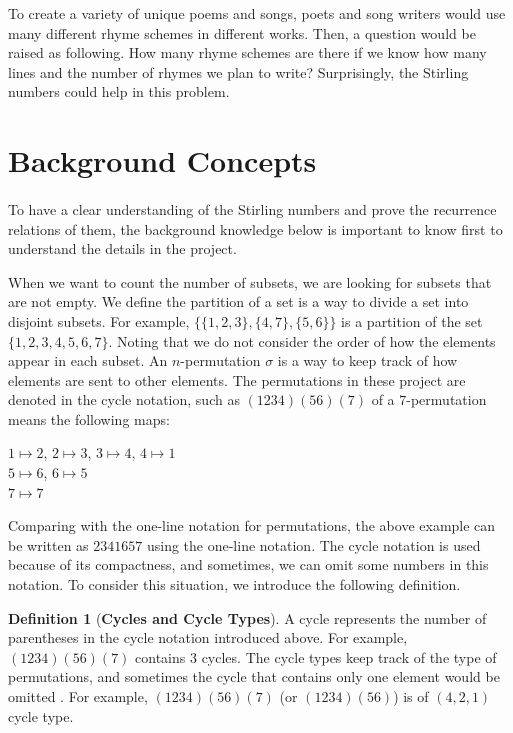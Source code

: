 \documentclass{article}
\theoremstyle{definition}
\newtheorem{definition}{Definition}[section]
\theoremstyle{remark}
\theoremstyle{example}
\begin{document}
To create a variety of unique poems and songs, poets and song writers would use many different rhyme schemes in different works. Then, a question would be raised as following. How many rhyme schemes are there if we know how many lines and the number of rhymes we plan to write? Surprisingly, the Stirling numbers could help in this problem.

\section{Background Concepts}
\paragraph{   }

To have a clear understanding of the Stirling numbers and prove the recurrence relations of them, the background knowledge below is important to know first to understand the details in the project.

When we want to count the number of subsets, we are looking for subsets that are not empty. We define the partition of a set is a way to divide a set into disjoint subsets. For example, $\{\{1,2,3\},\{4,7\}, \{5,6\}\}$ is a partition of the set $\{1,2,3,4,5,6,7\}$. Noting that we do not consider the order of how the elements appear in each subset. An $n$-permutation $\sigma$ is a way to keep track of how elements are sent to other elements. The permutations in these project are denoted in the cycle notation, such as $(1234)(56)(7)$ of a $7$-permutation means the following maps\cite{guichard_combinatorics_nodate}:

\begin{center}
$1 \mapsto 2$, $2 \mapsto 3 $, $3\mapsto 4$, $4\mapsto 1$\\
$5\mapsto 6$, $6\mapsto 5$\\
$7 \mapsto 7$
\end{center}

Comparing with the one-line notation for permutations, the above example can be written as $2341657$ using the one-line notation. The cycle notation is used because of its compactness, and sometimes, we can omit some numbers in this notation. To consider this situation, we introduce the following definition.

\begin{definition}[\textbf{Cycles and Cycle Types}]\label{def:cycles}
    A cycle represents the number of parentheses in the cycle notation introduced above. For example, $(1234)(56)(7)$ contains $3$ cycles. The cycle types keep track of the type of permutations, and sometimes the cycle that contains only one element would be omitted \cite{guichard_combinatorics_nodate}. For example, $(1234)(56)(7)$ (or $(1234)(56)$) is of $(4,2,1)$ cycle type.
\end{definition}
\end{document}

